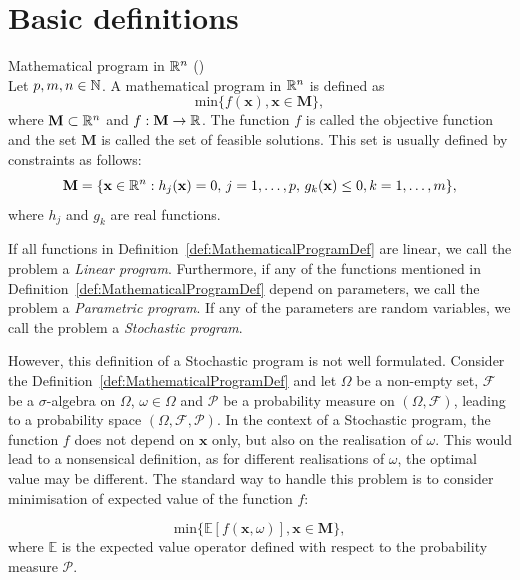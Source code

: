\section{Basic definitions}
\begin{defn} {\normalfont Mathematical program in $\mathbb{R}^n$} \label{def:MathematicalProgramDef}
 {\normalfont (\cite[p. 107]{dupacovastochasticprogramming})} \\
Let $p,m,n \in \mathbb{N}$. A mathematical program in $\mathbb{R}^n$ is defined as
\begin{equation*}
\mathrm{min} \{f(\mathbf{x}), \mathbf{x} \in \mathbf{M}\},
\end{equation*}
where $\mathbf{M} \subset \mathbb{R}^n$ and $f:\mathbf{M} \rightarrow \mathbb{R}$. The function $f$ is called the objective function and the set $\mathbf{M}$ is called the set of feasible solutions.
This set is usually defined by constraints as follows:
\begin{equation*}
	\mathbf{M} = \{\mathbf{x} \in \mathbb{R}^n: h_j(\mathbf{x})=0, \, j=1,\dots,p, \, g_k(\mathbf{x}) \leq 0, k=1,\dots,m \},
\end{equation*}
where $h_j$ and $g_k$ are real functions.
\end{defn}
If all functions in Definition~\ref{def:MathematicalProgramDef} are linear, we call the problem a \textit{Linear program}.
Furthermore, if any of the functions mentioned in Definition~\ref{def:MathematicalProgramDef} depend on parameters, we call the problem a \textit{Parametric program}. If any of the parameters are random variables, we call the problem a \textit{Stochastic program}.


However, this definition of a Stochastic program is not well formulated. Consider the Definition~\ref{def:MathematicalProgramDef} and let $\Omega$ be a non-empty set, $\mathcal{F}$ be a  $\sigma$-algebra on $\Omega$, $\omega \in \Omega$ and $\mathcal{P}$ be a probability measure on $(\Omega, \mathcal{F})$, leading to a probability space $(\Omega, \mathcal{F}, \mathcal{P})$. In the context of a Stochastic program, the function $f$ does not depend on $\mathbf{x}$ only, but also on the realisation of $\omega$. This would lead to a nonsensical definition, as for different realisations of $\omega$, the optimal value may be different. The standard way to handle this problem is to consider minimisation of expected value of the function $f$:

\begin{equation*}
\mathrm{min} \{\mathbb{E}\left[f(\mathbf{x}, \omega)\right], \mathbf{x} \in \mathbf{M}\},
\end{equation*}
where $\mathbb{E}$ is the expected value operator defined with respect to the probability measure $\mathcal{P}$. 


